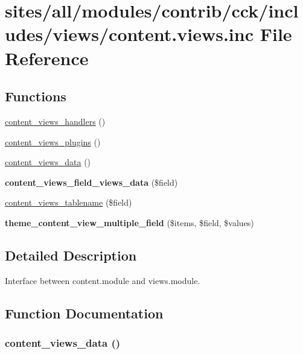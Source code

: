 \hypertarget{content_8views_8inc}{
\section{sites/all/modules/contrib/cck/includes/views/content.views.inc File Reference}
\label{content_8views_8inc}
}
\subsection*{Functions}
\begin{CompactItemize}
\item 
\hyperlink{content_8views_8inc_02002d63c10df31037660fba19b23a3a}{content\_\-views\_\-handlers} ()
\item 
\hyperlink{content_8views_8inc_727b12d4d80b6a884970dcbe22076610}{content\_\-views\_\-plugins} ()
\item 
\hyperlink{content_8views_8inc_32429a2898b49f28d93fba82b13665ba}{content\_\-views\_\-data} ()
\item 
\hypertarget{content_8views_8inc_16f904f5c6aba37e4ec2cc10016f4f66}{
\textbf{content\_\-views\_\-field\_\-views\_\-data} (\$field)}
\label{content_8views_8inc_16f904f5c6aba37e4ec2cc10016f4f66}

\item 
\hyperlink{content_8views_8inc_cf075753edcc51d1d5305e6e78ba1978}{content\_\-views\_\-tablename} (\$field)
\item 
\hypertarget{content_8views_8inc_57c13bc95240f085b19ff987c3053a6c}{
\textbf{theme\_\-content\_\-view\_\-multiple\_\-field} (\$items, \$field, \$values)}
\label{content_8views_8inc_57c13bc95240f085b19ff987c3053a6c}

\end{CompactItemize}


\subsection{Detailed Description}
Interface between content.module and views.module. 

\subsection{Function Documentation}
\hypertarget{content_8views_8inc_32429a2898b49f28d93fba82b13665ba}{
\subsubsection[{content\_\-views\_\-data}]{\setlength{\rightskip}{0pt plus 5cm}content\_\-views\_\-data ()}}
\label{content_8views_8inc_32429a2898b49f28d93fba82b13665ba}


